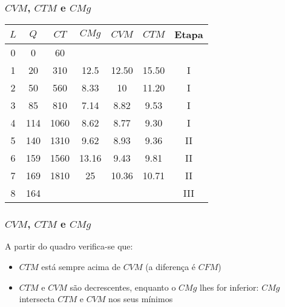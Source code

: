 \begin{frame}
	\frametitle{$CVM$, $CTM$ e $CMg$}
	\begin{center}
		{
		\renewcommand{\arraystretch}{1.1}
		\begin{tabular}{ccccccc}
			$L$ & $Q$ & $CT$ & $CMg$ & $CVM$ & $CTM$ & Etapa \\\hline \hline
			0 & 0 & 60  & & & & \\
			1 & 20 & 310 & \cellcolor{yellow!80!red} 12.5 & 12.50 & 15.50 & I \\
			2 & 50 & 560 & \cellcolor{yellow!80!red}8.33 & 10 & 11.20 & I \\
			3 & 85 & 810 & \cellcolor{yellow!80!red}7.14 & 8.82 & 9.53 & I \\
			4 & 114 & 1060 & \cellcolor{yellow!80!red}8.62 & \cellcolor{green!80!white}8.77 & 9.30 & I \\
			5 & 140 & 1310 & 9.62 & 8.93 & 9.36 & II \\
			6 & 159 & 1560 & 13.16 & 9.43 & 9.81 & II \\
			7 & 169 & 1810 & 25 & 10.36 & 10.71 & II \\
			8 & 164 &  &  &  &  & III
		\end{tabular}
		}
	\end{center}
\end{frame}

\begin{frame}
	\frametitle{$CVM$, $CTM$ e $CMg$}
	A partir do quadro verifica-se que:
	\begin{itemize}
		\item $CTM$ est\'a sempre acima de $CVM$ (a diferen\c ca \'e $CFM$)
		\item $CTM$ e $CVM$ s\~ao decrescentes, enquanto o $CMg$ lhes for inferior: $CMg$ intersecta $CTM$ e $CVM$ nos seus m\'inimos
	\end{itemize}
\end{frame}

